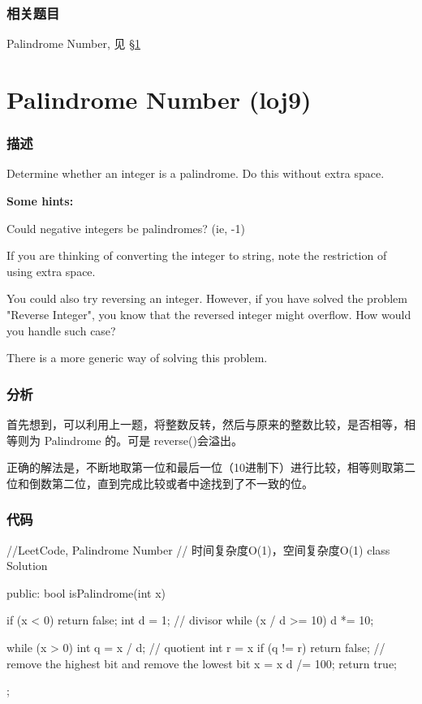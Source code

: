 \subsubsection{相关题目}
\begindot
\item Palindrome Number, 见 \S \ref{sec:palindrome-number}
\myenddot


\section{Palindrome Number (loj9)} %
\label{sec:palindrome-number}


\subsubsection{描述}
Determine whether an integer is a palindrome. Do this without extra space.

\textbf{Some hints:}

Could negative integers be palindromes? (ie, -1)

If you are thinking of converting the integer to string, note the restriction of using extra space.

You could also try reversing an integer. However, if you have solved the problem "Reverse Integer", you know that the reversed integer might overflow. How would you handle such case?

There is a more generic way of solving this problem.


\subsubsection{分析}
首先想到，可以利用上一题，将整数反转，然后与原来的整数比较，是否相等，相等则为 Palindrome 的。可是 reverse()会溢出。

正确的解法是，不断地取第一位和最后一位（10进制下）进行比较，相等则取第二位和倒数第二位，直到完成比较或者中途找到了不一致的位。


\subsubsection{代码}
\begin{Code}
//LeetCode, Palindrome Number
// 时间复杂度O(1)，空间复杂度O(1)
class Solution {
public:
    bool isPalindrome(int x) {
        if (x < 0) return false;
        int d = 1; // divisor
        while (x / d >= 10) d *= 10;

        while (x > 0) {
            int q = x / d;  // quotient
            int r = x %
            if (q != r) return false;
            // remove the highest bit and remove the lowest bit
            x = x %
            d /= 100;
        }
        return true;
    }
};
\end{Code}


